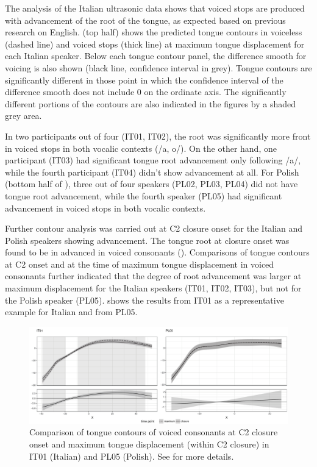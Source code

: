 \documentclass[authoryear, twocolumn]{elsarticle}
\begin{document}
The analysis of the Italian ultrasonic data shows that voiced stops are
produced with advancement of the root of the tongue, as expected based
on previous research on English.  (top half) shows the
predicted tongue contours in voiceless (dashed line) and voiced stops
(thick line) at maximum tongue displacement for each Italian speaker.
Below each tongue contour panel, the difference smooth for voicing is
also shown (black line, confidence interval in grey). Tongue contours
are significantly different in those point in which the confidence
interval of the difference smooth does not include 0 on the ordinate
axis. The significantly different portions of the contours are also
indicated in the figures by a shaded grey area.

In two participants out of four (IT01, IT02), the root was significantly
more front in voiced stops in both vocalic contexts (/a, o/). On the
other hand, one participant (IT03) had significant tongue root
advancement only following /a/, while the fourth participant (IT04)
didn't show advancement at all. For Polish (bottom half of
), three out of four speakers (PL02, PL03, PL04) did not
have tongue root advancement, while the fourth speaker (PL05) had
significant advancement in voiced stops in both vocalic contexts.

Further contour analysis was carried out at C2 closure onset for the
Italian and Polish speakers showing advancement. The tongue root at
closure onset was found to be in advanced in voiced consonants ().
Comparisons of tongue contours at C2 onset and at the time of maximum
tongue displacement in voiced consonants further indicated that the
degree of root advancement was larger at maximum displacement for the
Italian speakers (IT01, IT02, IT03), but not for the Polish speaker
(PL05).  shows the results from IT01 as a representative
example for Italian and from PL05.

\begin{figure}
    \centering
    \includegraphics[width=.9\textwidth]{fig/voiced.pdf}
    \caption{Comparison of tongue contours of voiced consonants at C2 closure onset and maximum tongue displacement (within C2 closure) in IT01 (Italian) and PL05 (Polish). See  for more details.}
    \label{f:voiced}
\end{figure}
\end{document}

